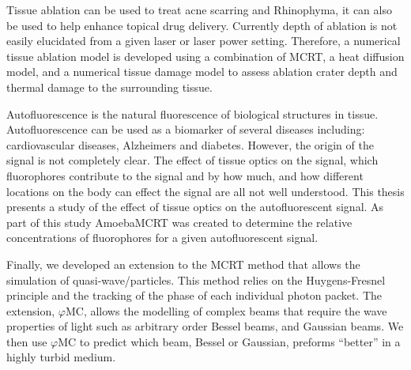 \documentclass[10pt,a4paper,twoside]{book}
\begin{document}
Tissue ablation can be used to treat acne scarring and Rhinophyma, it can also be used to help enhance topical drug delivery.
Currently depth of ablation is not easily elucidated from a given laser or laser power setting.
Therefore, a numerical tissue ablation model is developed using a combination of MCRT, a heat diffusion model, and a numerical tissue damage model to assess ablation crater depth and thermal damage to the surrounding tissue.

Autofluorescence is the natural fluorescence of biological structures in tissue.
Autofluorescence can be used as a biomarker of several diseases including: cardiovascular diseases, Alzheimers and diabetes.
However, the origin of the signal is not completely clear.
The effect of tissue optics on the signal, which fluorophores contribute to the signal and by how much, and how different locations on the body can effect the signal are all not well understood.
This thesis presents a study of the effect of tissue optics on the autofluorescent signal.
As part of this study AmoebaMCRT was created to determine the relative concentrations of fluorophores for a given autofluorescent signal.

Finally, we developed an extension to the MCRT method that allows the simulation of quasi-wave/particles.
This method relies on the Huygens-Fresnel principle and the tracking of the phase of each individual photon packet.
The extension, $\varphi$MC, allows the modelling of complex beams that require the wave properties of light such as arbitrary order Bessel beams, and Gaussian beams.
We then use $\varphi$MC to predict which beam, Bessel or Gaussian, preforms ``better'' in a highly turbid medium.



\end{document}
